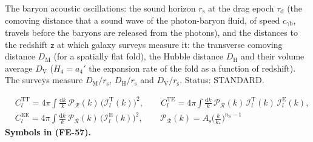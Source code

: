 \documentclass[
  10pt,
]{article}
\begin{document}
The baryon acoustic oscillations: the sound horizon \(r_{\mathrm{s}}\)
at the drag epoch \(\tau_{\mathrm{d}}\) (the comoving distance that a
sound wave of the photon-baryon fluid, of speed
\(c_{\gamma\mathrm{b}}\), travels before the baryons are released from
the photons), and the distances to the redshift \(\mathsf{z}\) at which
galaxy surveys measure it: the transverse comoving distance
\(D_{\mathrm{M}}\) (for a spatially flat fold), the Hubble distance
\(D_{\mathrm{H}}\) and their volume average \(D_{\mathrm{V}}\)
(\(H_4 = a_4'\) the expansion rate of the fold as a function of
redshift). The surveys measure \(D_{\mathrm{M}}/r_{\mathrm{s}}\),
\(D_{\mathrm{H}}/r_{\mathrm{s}}\) and \(D_{\mathrm{V}}/r_{\mathrm{s}}\).
Status: STANDARD.

\[
\begin{aligned}
&C_l^{\mathrm{TT}} = 4\pi\int\frac{\mathrm{d}k}{k}\,\mathcal{P}_{\mathcal{R}}(k)\,\big(\mathcal{I}_l^{\mathrm{T}}(k)\big)^2,\qquad
 C_l^{\mathrm{TE}} = 4\pi\int\frac{\mathrm{d}k}{k}\,\mathcal{P}_{\mathcal{R}}(k)\,\mathcal{I}_l^{\mathrm{T}}(k)\,\mathcal{I}_l^{\mathrm{E}}(k),\\
&C_l^{\mathrm{EE}} = 4\pi\int\frac{\mathrm{d}k}{k}\,\mathcal{P}_{\mathcal{R}}(k)\,\big(\mathcal{I}_l^{\mathrm{E}}(k)\big)^2,\qquad
 \mathcal{P}_{\mathcal{R}}(k) = A_{\mathrm{s}}\Big(\frac{k}{k_*}\Big)^{n_{\mathrm{S}} - 1}
\end{aligned} \tag{FE-57}
\] \textbf{Symbols in (FE-57).}
\end{document}
